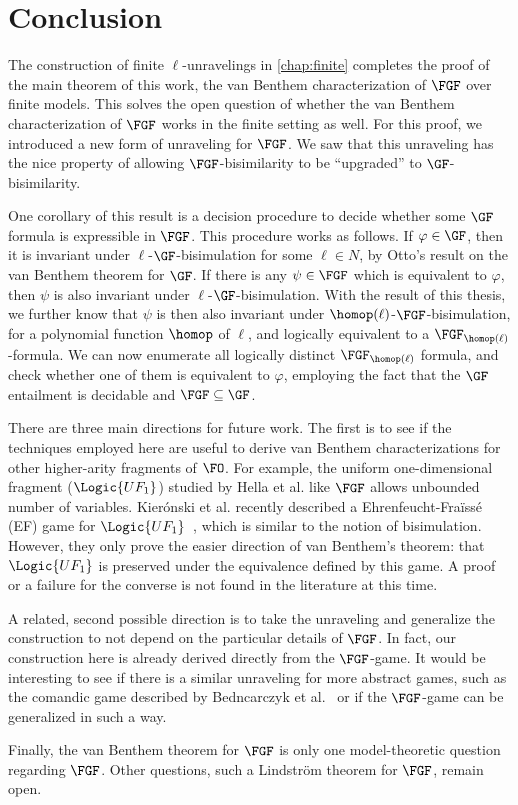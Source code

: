 \chapter{Conclusion}\label{chap:conclusion}
The construction of finite $\ell$-unravelings in \cref{chap:finite} completes the proof of the main theorem of this work, the van Benthem characterization of $\FGF$ over finite models.
This solves the open question of whether the van Benthem characterization of $\FGF$ works in the finite setting as well.
For this proof, we introduced a new form of unraveling for $\FGF$.
We saw that this unraveling has the nice property of allowing $\FGF$-bisimilarity to be ``upgraded'' to $\GF$-bisimilarity.

One corollary of this result is a decision procedure to decide whether some $\GF$ formula is expressible in $\FGF$.
This procedure works as follows.
If $\varphi \in \GF$, then it is invariant under $\ell$-$\GF$-bisimulation for some $\ell \in N$, by Otto's result on the van Benthem theorem for $\GF$.
If there is any $\psi \in \FGF$ which is equivalent to $\varphi$, then $\psi$ is also invariant under $\ell$-$\GF$-bisimulation.
With the result of this thesis, we further know that $\psi$ is then also invariant under $\homop(\ell)$-$\FGF$-bisimulation, for a polynomial function $\homop$ of $\ell$, and logically equivalent to a $\FGF_{\homop(\ell)}$-formula.
We can now enumerate all logically distinct $\FGF_{\homop(\ell)}$ formula, and check whether one of them is equivalent to $\varphi$, employing the fact that the $\GF$ entailment is decidable and $\FGF \subseteq \GF$.

There are three main directions for future work.
The first is to see if the techniques employed here are useful to derive van Benthem characterizations for other higher-arity fragments of $\FO$.
For example, the uniform one-dimensional fragment ($\Logic{UF_{1}}$) studied by Hella et al.\cite{hella2014} like $\FGF$ allows unbounded number of variables.
Kierónski et al. recently described a Ehrenfeucht-Fraïssé (EF) game for $\Logic{UF_{1}}$~\cite{kieronski2015}, which is similar to the notion of bisimulation.
However, they only prove the easier direction of van Benthem's theorem: that $\Logic{UF_{1}}$  is preserved under the equivalence defined by this game.
A proof or a failure for the converse is not found in the literature at this time.

A related, second possible direction is to take the unraveling and generalize the construction to not depend on the particular details of $\FGF$.
In fact, our construction here is already derived directly from the $\FGF$-game.
It would be interesting to see if there is a similar unraveling for more abstract games, such as the comandic game described by Bedncarczyk et al.~\cite{bednarczyk2022a} or if the $\FGF$-game can be generalized in such a way.

Finally, the van Benthem theorem for $\FGF$ is only one model-theoretic question regarding $\FGF$.
Other questions, such a Lindström theorem for $\FGF$, remain open.
